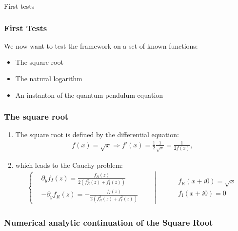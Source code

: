\begin{section}{First tests}
  \begin{frame}
    \frametitle{First Tests}
    We now want to test the framework on a set of known functions:
    \begin{itemize}
    \item The square root
    \item The natural logarithm
    \item An instanton of the quantum pendulum equation
    \end{itemize}
  \end{frame}

  \begin{frame}
    \frametitle{The square root}
    \begin{enumerate}
    \item The square root is defined by the differential equation:
      \begin{align*}
        f(x) = \sqrt{x} \Rightarrow f'(x) = \frac{1}{2}\frac{1}{\sqrt{x}} = \frac{1}{2f(x)},
      \end{align*}
      \item which leads to the Cauchy problem:
        \begin{align*}
          \left\{
          \begin{aligned}
            &\partial_yf_I(z) = \frac{f_R(z)}{2(f_R^2(z)+f_I^2(z))}\\
            &-\partial_yf_R(z) = -\frac{f_I(z)}{2(f_R^2(z)+f_I^2(z))}
          \end{aligned}
          \qquad
          \right|
          \qquad
          \begin{aligned}
            &f_{\mathrm R}(x+i0) = \sqrt{x}\\
            &f_{\mathrm I}(x+i0) = 0
          \end{aligned}
        \end{align*}
    \end{enumerate}
  \end{frame}
  \begin{frame}
    \frametitle{Numerical analytic continuation of the Square Root}
    
    
  \end{frame}


\end{section}
